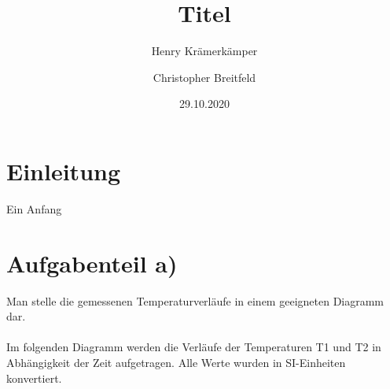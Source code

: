 \documentclass{scrartcl} %
\begin{document}
\title{Titel}
\author{Henry Krämerkämper \and Christopher Breitfeld}
\date{29.10.2020}
\maketitle
\newpage
\tableofcontents
\newpage
\section{Einleitung}
Ein Anfang
\section{Aufgabenteil a)}
  Man stelle die gemessenen Temperaturverläufe in einem geeigneten Diagramm dar. \\
  \\
  Im folgenden Diagramm werden die Verläufe der Temperaturen T1 und T2 in Abhängigkeit der Zeit aufgetragen.
  Alle Werte wurden in SI-Einheiten konvertiert.
  
\end{document}
